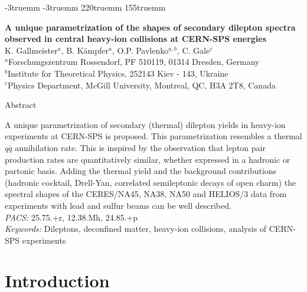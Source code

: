 \oddsidemargin -3truemm
\evensidemargin -3truemm
\marginparwidth 68pt\topmargin  -5mm
\headheight 0mm
\headsep 10mm
\textheight 220truemm
\textwidth 155truemm
\parindent=3mm
\parskip=0mm
\renewcommand{\baselinestretch}{1.2}
\sloppy


\begin{center}
{\large \bf
A unique parametrization of the shapes of secondary dilepton spectra
observed in central heavy-ion collisions at CERN-SPS energies}\\[6mm]
{\sc
K. Gallmeister$^a$, 
B. K\"ampfer$^a$, 
O.P. Pavlenko$^{a,b}$,
C. Gale$^c$} \\[6mm]
$^a$Forschungszentrum Rossendorf, PF 510119, 01314 Dresden, Germany \\[1mm]
$^b$Institute for Theoretical Physics, 252143 Kiev - 143, Ukraine\\[1mm]
$^c$Physics Department, McGill University, Montreal, QC, H3A 2T8, Canada
\end{center}

\vspace*{9mm}

\centerline{Abstract} %
A unique parametrization of secondary (thermal) dilepton yields in
heavy-ion experiments at CERN-SPS is proposed.
This parametrization resembles a thermal $q \bar q$ annihilation rate.
This is inspired by the observation that lepton pair production rates
are quantitatively similar, whether expressed in a hadronic or partonic
basis. Adding the thermal yield and
the background contributions (hadronic cocktail,
Drell-Yan, correlated semileptonic decays of open charm) 
the spectral shapes of the
CERES/NA45, NA38, NA50 and HELIOS/3 data 
from experiments with lead and sulfur beams can be well
described.\\[3mm]
{\it PACS:} 25.75.+r, 12.38.Mh, 24.85.+p\\
{\it Keywords:} Dileptons, deconfined matter, heavy-ion collisions,
analysis of CERN-SPS experiments

\section{Introduction} %

